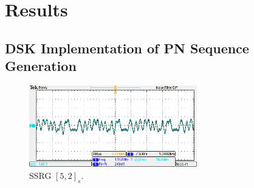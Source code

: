\documentclass{article}
\begin{document}

\section{Results}

\subsection{DSK Implementation of PN Sequence Generation}

\begin{figure}[h]
  \begin{center}
    \includegraphics[width=0.65\textwidth]{img/periodic_pseudo_sequence}
    \caption{SSRG $[5,2]_s$.}
  \end{center}
\end{figure}
\end{document}
